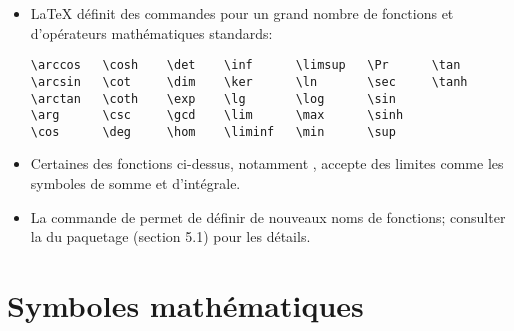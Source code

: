\begin{itemize}
\item {\LaTeX} définit des commandes pour un grand nombre de fonctions
  et d'opérateurs mathématiques standards:
\begin{lstlisting}
\arccos   \cosh    \det    \inf      \limsup   \Pr      \tan
\arcsin   \cot     \dim    \ker      \ln       \sec     \tanh
\arctan   \coth    \exp    \lg       \log      \sin
\arg      \csc     \gcd    \lim      \max      \sinh
\cos      \deg     \hom    \liminf   \min      \sup
\end{lstlisting}
\item Certaines des fonctions ci-dessus, notamment \cmd{\lim}, accepte
  des limites comme les symboles de somme et d'intégrale.
\item La commande \cmd{\DeclareMathOperator} de  permet
  de définir de nouveaux noms de fonctions; consulter la %
  du paquetage (section 5.1) pour les détails.
\end{itemize}



\section{Symboles mathématiques}
\label{sec:math:symboles}

